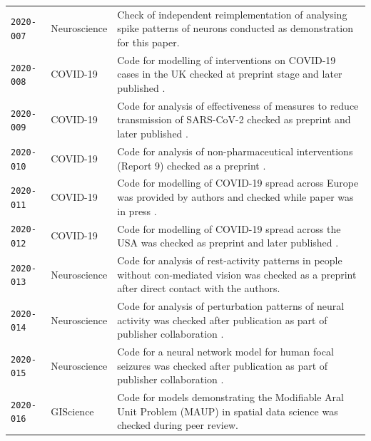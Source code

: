 \documentclass[12pt]{article}
\begin{document}
\begin{table}
\begin{tabular}{llp{12cm}}
    \texttt{2020-007}  \cite{cert-2020-007} & Neuroscience & Check of independent reimplementation of analysing spike patterns of neurons \cite{hathway_re_2018} conducted as demonstration for this paper. \\
    \texttt{2020-008}  \cite{cert-2020-008} & COVID-19 & Code for modelling of interventions on COVID-19 cases in the UK checked at preprint stage \cite{davies-preprint-2020} and later published \cite{Davies2020-vj}. \\
    \texttt{2020-009}  \cite{cert-2020-009} & COVID-19 & Code for analysis of effectiveness of measures to reduce transmission of SARS-CoV-2 checked as preprint \cite{kucharski-preprint-2020} and later published \cite{kucharski_effectiveness_2020}. \\ %
    \texttt{2020-010}  \cite{cert-2020-010} & COVID-19 & Code for analysis of non-pharmaceutical interventions (Report 9) checked as a preprint \cite{ferguson_report_2020}. \\ %
    \texttt{2020-011}  \cite{cert-2020-011} & COVID-19 & Code for modelling of COVID-19 spread across Europe was provided by authors and checked while paper was in press \cite{flaxman_estimating_2020}. \\
    \texttt{2020-012}  \cite{cert-2020-012} & COVID-19 & Code for modelling of COVID-19 spread across the USA was checked as preprint \cite{unwin_report_2020} and later published \cite{unwin_state-level_2020}. \\
    \texttt{2020-013}  \cite{cert-2020-013} & Neuroscience & Code for analysis of rest-activity patterns in people without con-mediated vision was checked as a preprint \cite{Spitschan2020.06.02.129502} after direct contact with the authors. \\ %
    \texttt{2020-014}  \cite{cert-2020-014} & Neuroscience & Code for analysis of perturbation patterns of neural activity was checked after publication as part of publisher collaboration \cite{Sadeh2020}. \\ %
    \texttt{2020-015}  \cite{cert-2020-015} & Neuroscience & Code for a neural network model for human focal seizures was checked after publication as part of publisher collaboration \cite{Liou2020}. \\ %
    \texttt{2020-016}  \cite{cert-2020-016} & GIScience & Code for models demonstrating the Modifiable Aral Unit Problem (MAUP) in spatial data science \cite{Brunsdon2020} was checked during peer review. \\ %

\end{tabular}
\end{table}
\end{document}
